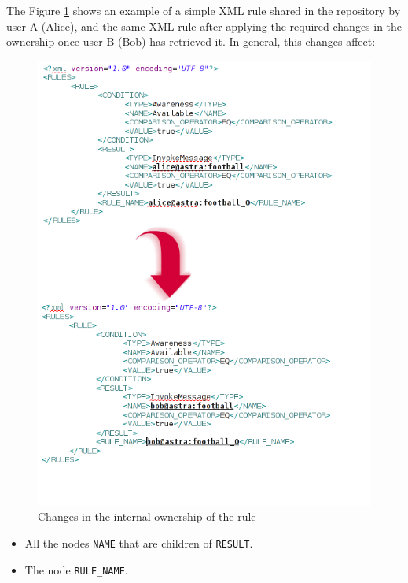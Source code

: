 The Figure \ref{img:rule-internal-adaptation} shows an example of a simple XML
rule shared in the repository by user A (Alice), and the same XML rule after
applying the required changes in the ownership once user B (Bob) has retrieved
it. In general, this changes affect:

\begin{figure}[h!]
 \begin{center}

 \includegraphics[scale=0.5]{screenshots/rules-transformation.png}
  \caption{\label{img:rule-internal-adaptation}Changes in the internal ownership
  of the rule}
 \end{center}
\end{figure}

\begin{itemize}
  \item All the nodes \verb|NAME| that are children of
  \verb|RESULT|.
  \item The node \verb|RULE_NAME|.
\end{itemize}

